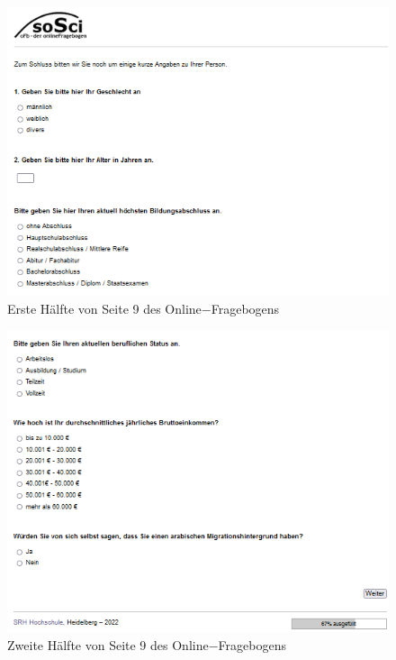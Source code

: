 \begin{appendices}
    \newpage
    \begin{figure}[htb!]
        \centering
            \includegraphics[width=\textwidth, frame]{Seite 9_1.png}
            \caption[]{Erste Hälfte von Seite 9 des Online$-$Fragebogens}
    \end{figure}
    
    \newpage
    \begin{figure}[htb!]
        \centering
            \includegraphics[width=\textwidth, frame]{Seite 9_2.png}
            \caption[]{Zweite Hälfte von Seite 9 des Online$-$Fragebogens}
    \end{figure}
    

\end{appendices}
